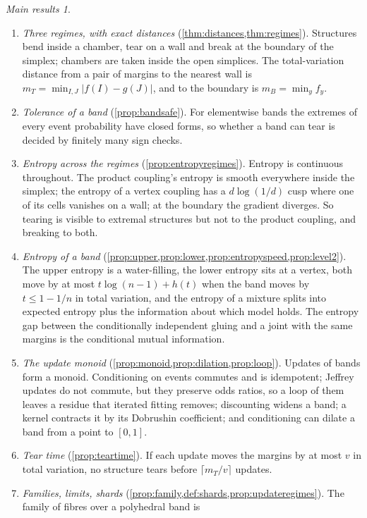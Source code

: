 \documentclass[11pt]{article}
\theoremstyle{definition}
\theoremstyle{remark}
\newtheorem*{mainthm}{Main results}
\begin{document}
\begin{mainthm}
\leavevmode
\begin{enumerate}[label=(\Alph*),leftmargin=*]
\item \emph{Three regimes, with exact distances} (\cref{thm:distances,thm:regimes}). Structures bend inside a chamber,
  tear on a wall and break at the boundary of the simplex; chambers are taken inside the open simplices. The total-variation distance from a pair of margins to the
  nearest wall is $m_T=\min_{I,J}\lvert f(I)-g(J)\rvert$, and to the boundary is $m_B=\min_yf_y$.
\item \emph{Tolerance of a band} (\cref{prop:bandsafe}). For elementwise bands the extremes of every event probability
  have closed forms, so whether a band can tear is decided by finitely many sign checks.
\item \emph{Entropy across the regimes} (\cref{prop:entropyregimes}). Entropy is continuous throughout. The product
  coupling's entropy is smooth everywhere inside the simplex; the entropy of a vertex coupling has a $d\log(1/d)$ cusp
  where one of its cells vanishes on a wall; at the boundary the gradient diverges. So tearing is visible to extremal
  structures but not to the product coupling, and breaking to both.
\item \emph{Entropy of a band} (\cref{prop:upper,prop:lower,prop:entropyspeed,prop:level2}). The upper entropy is a
  water-filling, the lower entropy sits at a vertex, both move by at most $t\log(n-1)+h(t)$ when the band moves by
  $t\le1-1/n$ in total variation, and the entropy of a mixture splits into expected entropy plus the information about which model holds.
  The entropy gap between the conditionally independent gluing and a joint with the same margins is the conditional
  mutual information.
\item \emph{The update monoid} (\cref{prop:monoid,prop:dilation,prop:loop}). Updates of bands form a monoid. Conditioning on events
  commutes and is idempotent; Jeffrey updates do not commute, but they preserve odds ratios, so a loop of them leaves a residue
  that iterated fitting removes; discounting widens a band; a kernel contracts it by its Dobrushin coefficient; and
  conditioning can dilate a band from a point to $[0,1]$.
\item \emph{Tear time} (\cref{prop:teartime}). If each update moves the margins by at most $v$ in total variation, no
  structure tears before $\lceil m_T/v\rceil$ updates.
\item \emph{Families, limits, shards} (\cref{prop:family,def:shards,prop:updateregimes}). The family of fibres over a polyhedral band is

\end{enumerate}
\end{mainthm}
\end{document}
